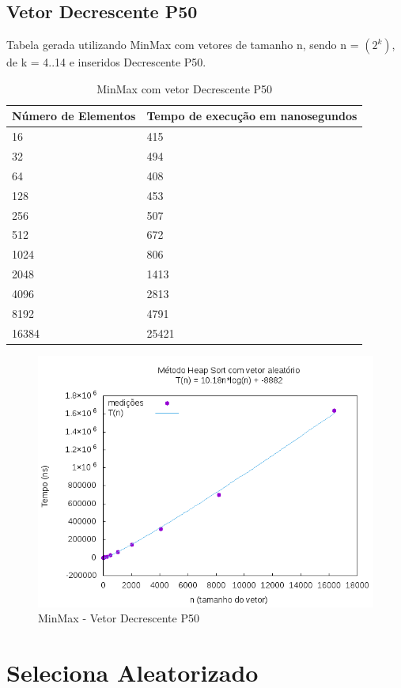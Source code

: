 \documentclass[12pt,a4paper,twoside]{report}
\begin{document}
\subsection{Vetor Decrescente P50}
Tabela gerada utilizando MinMax com vetores de tamanho n, sendo n = $(2^k)$, de k = 4..14 e inseridos Decrescente P50.
\begin{table}[H]
\centering
\caption{MinMax com vetor Decrescente P50}
\label{my-label}
\begin{tabular}{|l|l|}
\hline
\multicolumn{1}{|c|}{\textbf{Número de Elementos}} & \multicolumn{1}{c|}{\textbf{Tempo de execução em nanosegundos}} \\ \hline
16 & 415 \\ \hline
32 & 494 \\ \hline
64 & 408 \\ \hline
128 & 453 \\ \hline
256 & 507 \\ \hline
512 & 672 \\ \hline
1024 & 806 \\ \hline
2048 & 1413 \\ \hline
4096 & 2813 \\ \hline
8192 & 4791 \\ \hline
16384 & 25421 \\ \hline
\end{tabular}
\end{table}

\begin{figure}[H]
    \centering
    \includegraphics[width=0.7\linewidth]{graficos/HeapSort/vIntAleatorio/vIntAleatorio.png}
  \caption{MinMax - Vetor Decrescente P50}
\end{figure}

\section{Seleciona Aleatorizado}
\end{document}
